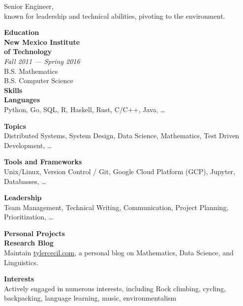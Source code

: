 \documentclass[11pt,a4paper,sans]{article}
\newcommand{\cvcolor}[1]{{\color{MidnightBlue}#1}}
\renewcommand{\section}[1]{
  \cvcolor{\noindent \textbf{\LARGE #1}}
  \vspace{.5em}\\
}
\renewcommand{\subsection}[1]{
  \cvcolor{\noindent \textbf{\large #1} \dotfill}
  \\
}
\begin{document}
\begin{minipage}[t]{0.3\linewidth}

  {\color{darkgray}
    {
      \fontsize{18pt}{20pt}\selectfont
      \noindent
      Senior Engineer,\\
      known for leadership and technical abilities, pivoting
      to the environment.
    }
  }
  \vspace{1em}

\section{Education}
\textbf{New Mexico Institute \\ of Technology}\\
\textsl{Fall 2011 --- Spring 2016}\\
  \faGraduationCap \hspace{1ex} B.S. Mathematics\\
  \faGraduationCap \hspace{1ex} B.S. Computer Science\\

\section{Skills}
\subsection{Languages}
Python,
Go,
SQL,
R,
Haskell,
Rust,
C/C++,
Java,
\ldots

\subsection{Topics}
Distributed Systems,
System Design,
Data Science,
Mathematics,
Test Driven Development,
\ldots

\subsection{Tools and Frameworks}
Unix/Linux,
Version Control / Git,
Google Cloud Platform (GCP),
Jupyter,
Databasses,
\ldots

\subsection{Leadership}
Team Management,
Technical Writing,
Communication,
Project Planning,
Prioritization,
\ldots

\vspace{1em}
\section{Personal Projects}
\textbf{Research Blog}\\
Maintain \href{https://tylercecil.com}{tylercecil.com}, a personal blog on
  Mathematics, Data Science, and Linguistics.

\textbf{Interests}\\
Actively engaged in numerous interests, including
Rock climbing, cycling, backpacking, language learning, music,
environmentalism

\end{minipage}
\end{document}
